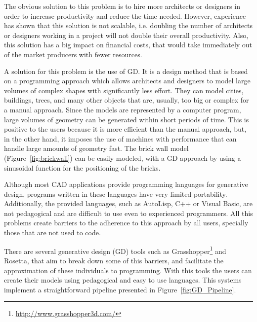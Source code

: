 
The obvious solution to this problem is to hire more architects or designers in order to increase productivity and reduce the time needed. However, experience has shown that this solution is not scalable, i.e. doubling the number of architects or designers working in a project will not double their overall productivity. Also, this solution has a big impact on financial costs, that would take immediately out of the market producers with fewer resources.

A solution for this problem is the use of \gls{GD}. It is a design method that is based on a programming approach which allows architects and designers to model large volumes of complex shapes with significantly less effort. They can model cities, buildings, trees, and many other objects that are, usually, too big or complex for a manual approach. Since the models are represented by a computer program, large volumes of geometry can be generated within short periods of time. This is positive to the users because it is more efficient than the manual approach, but, in the other hand, it imposes the use of machines with performance that can handle large amounts of geometry fast. The brick wall model (Figure~\ref{fig:brickwall}) can be easily modeled, with a \gls{GD} approach by using a sinusoidal function for the positioning of the bricks. 

Although most \gls{CAD} applications provide programming languages for generative design, programs written in these languages have very limited portability. Additionally, the provided languages, such as AutoLisp, C++ or Visual Basic, are not pedagogical and are difficult to use even to experienced programmers. All this problems create barriers to the adherence to this approach by all users, specially those that are not used to code.\cite{ramos_et_al:OASIcs:2014:4565}

There are several generative design (GD) tools such as Grasshopper\footnote{\url{http://www.grasshopper3d.com/}} and Rosetta\cite{Leit2012}, that aim to break down some of this barriers, and facilitate the approximation of these individuals to programming. With this tools the users can create their models using pedagogical and easy to use languages. This systems implement a straightforward pipeline presented in Figure~\ref{fig:GD_Pipeline}.



